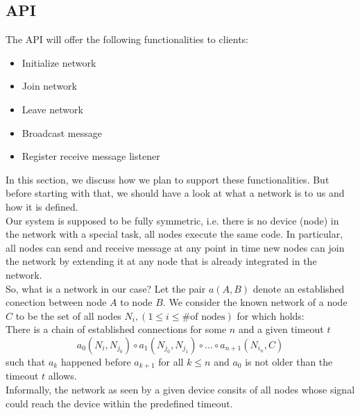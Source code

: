 		\subsection{API}
		The API will offer the following functionalities to clients:
		\begin{itemize}
			\item {Initialize network}
			\item {Join network}
			\item {Leave network}
			\item {Broadcast message}
			\item {Register receive message listener}
		\end{itemize}
		In this section, we discuss how we plan to support these functionalities. But before starting with that, we should have a look at
		what a network is to us and how it is defined.\\
		Our system is supposed to be fully symmetric, i.e. there is no device (node) in the network with a special task, all nodes execute the same code. In particular, all nodes can send and receive message at any point in time new nodes can join the network by extending it at any node that is already integrated in the network.\\
		So, what is a network in our case? Let the pair $a(A,B)$ denote an established conection between node $A$ to node $B$. We consider the known network of a node $C$ to be the set of all nodes $N_i, (1 \leq i \leq \text{\# of nodes})$ for which holds:  \\
		There is a chain of established connections for some $n$ and a given timeout $t$
		\begin{displaymath}
			a_0(N_{i},N_{j_0}) \circ a_1(N_{j_0},N_{j_1}) \circ \ldots \circ a_{n+1}(N_{i_n},C)
		\end{displaymath}
		such that $a_k$ happened before $a_{k+1}$ for all $k \leq n$ and $a_0$ is not older than the timeout $t$ allows. \\
		Informally, the network as seen by a given device consits of all nodes whose signal could reach the device within the predefined timeout. \\
			
